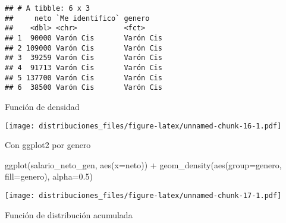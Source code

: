 \documentclass[
]{article}
\newenvironment{Shaded}{\begin{snugshade}}{\end{snugshade}}
\newcommand{\AttributeTok}[1]{\textcolor[rgb]{0.77,0.63,0.00}{#1}}
\newcommand{\DecValTok}[1]{\textcolor[rgb]{0.00,0.00,0.81}{#1}}
\newcommand{\FloatTok}[1]{\textcolor[rgb]{0.00,0.00,0.81}{#1}}
\newcommand{\FunctionTok}[1]{\textcolor[rgb]{0.00,0.00,0.00}{#1}}
\newcommand{\NormalTok}[1]{#1}
\newcommand{\OtherTok}[1]{\textcolor[rgb]{0.56,0.35,0.01}{#1}}
\newcommand{\SpecialCharTok}[1]{\textcolor[rgb]{0.00,0.00,0.00}{#1}}
\newcommand{\StringTok}[1]{\textcolor[rgb]{0.31,0.60,0.02}{#1}}
\begin{document}
\begin{verbatim}
## # A tibble: 6 x 3
##     neto `Me identifico` genero   
##    <dbl> <chr>           <fct>    
## 1  90000 Varón Cis       Varón Cis
## 2 109000 Varón Cis       Varón Cis
## 3  39259 Varón Cis       Varón Cis
## 4  91713 Varón Cis       Varón Cis
## 5 137700 Varón Cis       Varón Cis
## 6  38500 Varón Cis       Varón Cis
\end{verbatim}

Función de densidad

\begin{Shaded}
\end{Shaded}

\texttt{[image: distribuciones\_files/figure-latex/unnamed-chunk-16-1.pdf]}

Con ggplot2 por genero

\begin{Shaded}
\begin{Highlighting}[]
\FunctionTok{ggplot}\NormalTok{(salario\_neto\_gen, }\FunctionTok{aes}\NormalTok{(}\AttributeTok{x=}\NormalTok{neto)) }\SpecialCharTok{+} 
  \FunctionTok{geom\_density}\NormalTok{(}\FunctionTok{aes}\NormalTok{(}\AttributeTok{group=}\NormalTok{genero, }\AttributeTok{fill=}\NormalTok{genero), }\AttributeTok{alpha=}\FloatTok{0.5}\NormalTok{)}
\end{Highlighting}
\end{Shaded}

\texttt{[image: distribuciones\_files/figure-latex/unnamed-chunk-17-1.pdf]}

Función de distribución acumulada

\begin{Shaded}
\end{Shaded}
\end{document}
